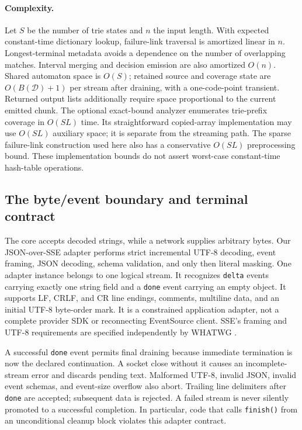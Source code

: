 \documentclass[11pt,a4paper]{article}
\newcommand{\D}{\mathcal{D}}
\begin{document}
\paragraph{Complexity.}
Let $S$ be the number of trie states and $n$ the input length. With expected constant-time dictionary lookup, failure-link traversal is amortized linear in $n$. Longest-terminal metadata avoids a dependence on the number of overlapping matches. Interval merging and decision emission are also amortized $O(n)$. Shared automaton space is $O(S)$; retained source and coverage state are $O(B(\D)+1)$ per stream after draining, with a one-code-point transient. Returned output lists additionally require space proportional to the current emitted chunk. The optional exact-bound analyzer enumerates trie-prefix coverage in $O(SL)$ time. Its straightforward copied-array implementation may use $O(SL)$ auxiliary space; it is separate from the streaming path. The sparse failure-link construction used here also has a conservative $O(SL)$ preprocessing bound. These implementation bounds do not assert worst-case constant-time hash-table operations.

\subsection{The byte/event boundary and terminal contract}
The core accepts decoded strings, while a network supplies arbitrary bytes. Our JSON-over-SSE adapter performs strict incremental UTF-8 decoding, event framing, JSON decoding, schema validation, and only then literal masking. One adapter instance belongs to one logical stream. It recognizes \texttt{delta} events carrying exactly one string field and a \texttt{done} event carrying an empty object. It supports LF, CRLF, and CR line endings, comments, multiline data, and an initial UTF-8 byte-order mark. It is a constrained application adapter, not a complete provider SDK or reconnecting EventSource client. SSE's framing and UTF-8 requirements are specified independently by WHATWG \cite{sse}.

A successful \texttt{done} event permits final draining because immediate termination is now the declared continuation. A socket close without it causes an incomplete-stream error and discards pending text. Malformed UTF-8, invalid JSON, invalid event schemas, and event-size overflow also abort. Trailing line delimiters after \texttt{done} are accepted; subsequent data is rejected. A failed stream is never silently promoted to a successful completion. In particular, code that calls \texttt{finish()} from an unconditional cleanup block violates this adapter contract.
\end{document}
